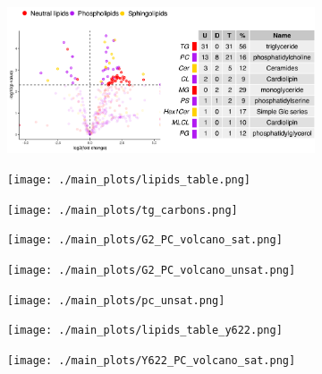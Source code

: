\begin{figure}[H]
    \begin{subfigure}[t]{.3\textwidth}
        \caption{}
        \includegraphics[width=\textwidth]{./main_plots/iN_lipids_overview.png}        
    \end{subfigure} 
    \begin{subfigure}[t]{.3\textwidth}
        \caption{}
        \texttt{[image: ./main\_plots/lipids\_table.png]}        
    \end{subfigure} 
    \begin{subfigure}[t]{.3\textwidth}
        \caption{}
        \texttt{[image: ./main\_plots/tg\_carbons.png]}        
    \end{subfigure} 
    \begin{subfigure}[t]{.3\textwidth}
        \caption{}
        \texttt{[image: ./main\_plots/G2\_PC\_volcano\_sat.png]}        
    \end{subfigure} 
    \begin{subfigure}[t]{.3\textwidth}
        \caption{}
        \texttt{[image: ./main\_plots/G2\_PC\_volcano\_unsat.png]}        
    \end{subfigure} 
    \begin{subfigure}[t]{.3\textwidth}
        \caption{}
        \texttt{[image: ./main\_plots/pc\_unsat.png]}        
    \end{subfigure} 
    \begin{subfigure}[t]{.3\textwidth}
        \caption{}
        \texttt{[image: ./main\_plots/lipids\_table\_y622.png]}        
    \end{subfigure}
    \begin{subfigure}[t]{.3\textwidth}
        \caption{}
        \texttt{[image: ./main\_plots/Y622\_PC\_volcano\_sat.png]}        
    \end{subfigure} 
    \begin{subfigure}[t]{.3\textwidth}

\end{subfigure}
\end{figure}
